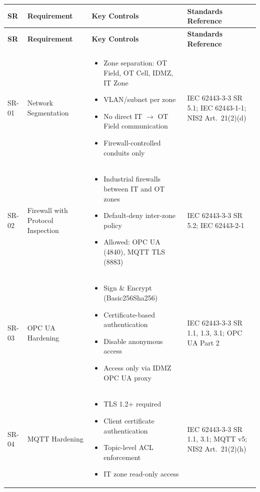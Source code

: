 \begin{longtable}{p{1.2cm} p{3.2cm} p{5.2cm} p{4.2cm}} \\

\toprule
\textbf{SR} & \textbf{Requirement} & \textbf{Key Controls} & \textbf{Standards Reference} \\
\midrule
\endfirsthead

\toprule
\textbf{SR} & \textbf{Requirement} & \textbf{Key Controls} & \textbf{Standards Reference} \\
\midrule
\endhead

\bottomrule
\endlastfoot

SR-01 & Network Segmentation &
\begin{itemize}[leftmargin=*, noitemsep, topsep=2pt]
\item Zone separation: OT Field, OT Cell, IDMZ, IT Zone
\item VLAN/subnet per zone
\item No direct IT $\rightarrow$ OT Field communication
\item Firewall-controlled conduits only
\end{itemize}
&
IEC 62443-3-3 SR 5.1; IEC 62443-1-1; NIS2 Art.~21(2)(d) \\

SR-02 & Firewall with Protocol Inspection &
\begin{itemize}[leftmargin=*, noitemsep, topsep=2pt]
\item Industrial firewalls between IT and OT zones
\item Default-deny inter-zone policy
\item Allowed: OPC UA (4840), MQTT TLS (8883)
\end{itemize}
&
IEC 62443-3-3 SR 5.2; IEC 62443-2-1 \\

SR-03 & OPC UA Hardening &
\begin{itemize}[leftmargin=*, noitemsep, topsep=2pt]
\item Sign \& Encrypt (Basic256Sha256)
\item Certificate-based authentication
\item Disable anonymous access
\item Access only via IDMZ OPC UA proxy
\end{itemize}
&
IEC 62443-3-3 SR 1.1, 1.3, 3.1; OPC UA Part 2 \\

SR-04 & MQTT Hardening &
\begin{itemize}[leftmargin=*, noitemsep, topsep=2pt]
\item TLS 1.2+ required
\item Client certificate authentication
\item Topic-level ACL enforcement
\item IT zone read-only access
\end{itemize}
&
IEC 62443-3-3 SR 1.1, 3.1; MQTT v5; NIS2 Art.~21(2)(h) \\


\end{longtable}
